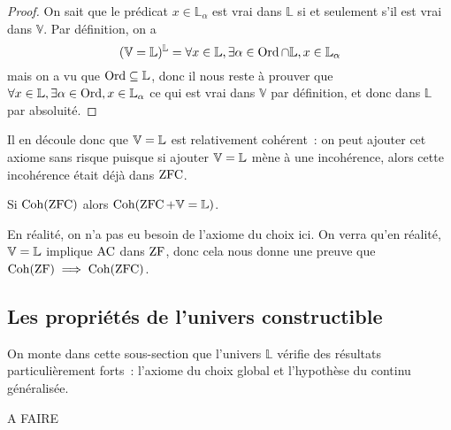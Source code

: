\begin{proof}
  On sait que le prédicat $x\in \mathbb L_{\alpha}$ est vrai dans
  $\mathbb L$ si et seulement s'il est vrai dans $\mathbb V$. Par définition,
  on a
  \[(\mathbb V = \mathbb L)^{\mathbb L} =
  \forall x \in \mathbb L,\exists \alpha \in \operatorname{Ord}\cap \mathbb L,
  x\in \mathbb L_\alpha\]
  mais on a vu que $\operatorname{Ord}\subseteq \mathbb L$, donc il nous reste à prouver que
  $\forall x \in \mathbb L, \exists \alpha \in \operatorname{Ord}, x \in \mathbb L_\alpha$
  ce qui est vrai dans $\mathbb V$ par définition, et donc dans
  $\mathbb L$ par absoluité.
\end{proof}

Il en découle donc que $\mathbb V = \mathbb L$ est relativement cohérent~: on peut ajouter cet
axiome sans risque puisque si ajouter $\mathbb V = \mathbb L$ mène à une incohérence, alors
cette incohérence était déjà dans $\operatorname{ZFC}$.

\begin{corollary}
  Si $\operatorname{Coh}(\operatorname{ZFC})$ alors $\operatorname{Coh}(\operatorname{ZFC} + \mathbb V = \mathbb L)$.
\end{corollary}

\begin{remark}
  En réalité, on n'a pas eu besoin de l'axiome du choix ici. On verra qu'en
  réalité, $\mathbb V = \mathbb L$ implique $\operatorname{AC}$ dans $\operatorname{ZF}$, donc cela nous donne une preuve
  que $\operatorname{Coh}(\operatorname{ZF})\implies \operatorname{Coh}(\operatorname{ZFC})$.
\end{remark}

\subsection{Les propriétés de l'univers constructible}

On monte dans cette sous-section que l'univers $\mathbb L$ vérifie des résultats
particulièrement forts~: l'axiome du choix global et l'hypothèse du continu
généralisée.

A FAIRE
